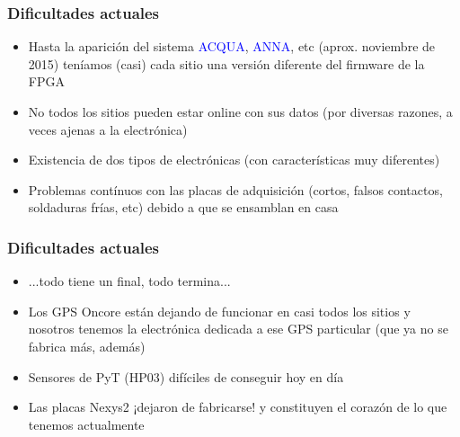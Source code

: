 \documentclass{beamer}
\begin{document}
\begin{frame}
	\frametitle{Dificultades actuales}
	\begin{alertblock}{}
		\begin{itemize}
						\item Hasta la aparición del sistema \textcolor{blue}{ACQUA},
										\textcolor{blue}{ANNA}, etc
										(aprox. noviembre de 2015) teníamos (casi) \alert{cada sitio una versión
					diferente del firmware} de la FPGA 
	\item \alert{No todos los sitios pueden estar online con sus datos} (por diversas
					razones, a veces ajenas a la electrónica)
	\item Existencia de dos tipos de electrónicas (\alert{con características muy
					diferentes})
		\item Problemas contínuos con las placas de adquisición (cortos, falsos
					contactos, soldaduras frías, etc) debido a que se ensamblan en casa
		\end{itemize}
	\end{alertblock}
\end{frame} 

\begin{frame}
	\frametitle{Dificultades actuales}
	\begin{alertblock}{}
		\begin{itemize}
		\item ...todo tiene un final, todo termina...
		\item Los GPS Oncore están dejando de funcionar en casi todos los sitios y
						nosotros tenemos la electrónica dedicada a ese GPS particular (\alert{que ya no se
										fabrica más}, además)
		\item Sensores de PyT (HP03) difíciles de conseguir hoy en día
		\item Las placas Nexys2 \alert{¡dejaron de fabricarse!} y constituyen el
					corazón de lo que tenemos actualmente
		\end{itemize}
	\end{alertblock}
\end{frame} 
\end{document}
